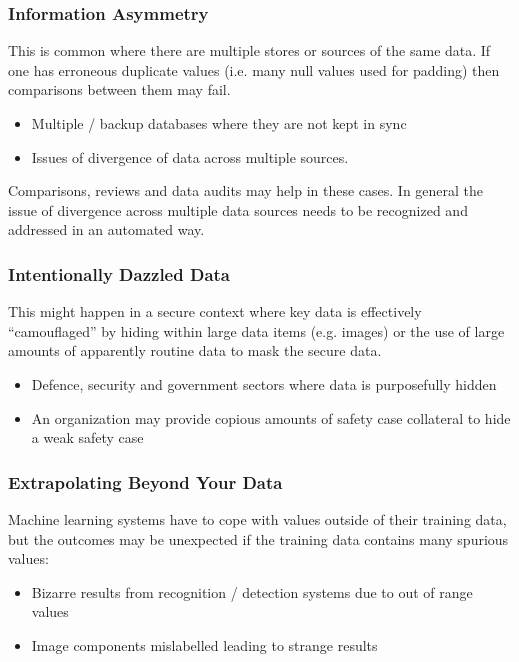 \subsubsection{Information Asymmetry}
This is common where there are multiple stores or sources of the same data. If one has erroneous duplicate values (i.e. many null values used for padding) then comparisons between them may fail.
\begin{itemize}
    \item Multiple / backup databases where they are not kept in sync
    \item Issues of divergence of data across multiple sources.
\end{itemize}

Comparisons, reviews and data audits may help in these cases. In general the issue of divergence across multiple data sources needs to be recognized and addressed in an automated way.

\subsubsection{Intentionally Dazzled Data}
This might happen in a secure context where key data is effectively ``camouflaged'' by hiding within large data items (e.g. images) or the use of large amounts of apparently routine data to mask the secure data.
\begin{itemize}
    \item Defence, security and government sectors where data is purposefully hidden 
    \item An organization may provide copious amounts of safety case collateral to hide a weak safety case
\end{itemize}
\subsubsection{Extrapolating Beyond Your Data}
Machine learning systems have to cope with values outside of their training data, but the outcomes may be unexpected if the training data contains many spurious values:
\begin{itemize}
    \item Bizarre results from recognition / detection systems due to out of range values
    \item Image components mislabelled leading to strange results
\end{itemize}

